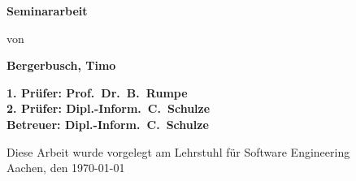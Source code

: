 \begin{titlepage}
\begin{flushleft}
{    {\Large \textbf{Seminararbeit}\\}
		\vspace{3em} 
		
		{\large von\\} %
    
    {\LARGE \textbf{Bergerbusch, Timo}\\}
    \vspace{3em} 
		    
    {\Large \textbf{1. Prüfer: Prof.\ Dr.\ B.\ Rumpe}\\}
    \vspace{1em} 
    {\Large \textbf{2. Prüfer: Dipl.-Inform.\ C.\ Schulze}\\}
    \vspace{1em} 
    {\Large \textbf{Betreuer: Dipl.-Inform.\ C.\ Schulze}\\}
    \vspace{7em} 

    {\large Diese Arbeit wurde vorgelegt am Lehrstuhl für Software Engineering \\}
    \vspace{1em}
		{\large	Aachen, den \today\\}
  }
\end{flushleft}

\end{titlepage}






